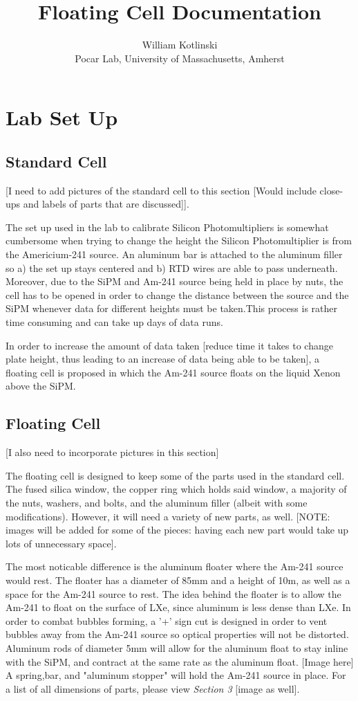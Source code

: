 \documentclass{article}%
\title{Floating Cell Documentation}
\date{\day}
\author{William Kotlinski\\Pocar Lab, University of Massachusetts, Amherst}
\begin{document}
\newpage
\tableofcontents
\newpage
\section{Lab Set Up}
\subsection{Standard Cell}
[I need to add pictures of the standard cell to this section [Would include close-ups and labels of parts that are discussed]].

The set up used in the lab to calibrate Silicon Photomultipliers is somewhat cumbersome when trying to change the height the Silicon Photomultiplier is from the Americium-241 source. An aluminum bar is attached to the aluminum filler so a) the set up stays centered and b) RTD wires are able to pass underneath. Moreover, due to the SiPM and Am-241 source being held in place by nuts, the cell has to be opened in order to change the distance between the source and the SiPM whenever data for different heights must be taken.This process is rather time consuming and can take up days of data runs. 

In order to increase the amount of data taken [reduce time it takes to change plate height, thus leading to an increase of data being able to be taken], a floating cell is proposed in which the Am-241 source floats on the liquid Xenon above the SiPM.
\subsection{Floating Cell}
[I also need to incorporate pictures in this section]

The floating cell is designed to keep some of the parts used in the standard cell. The fused silica window, the copper ring which holds said window,  a majority of the nuts, washers, and bolts, and the aluminum filler (albeit with some modifications). However, it will need a variety of new parts, as well. [NOTE: images will be added for some of the pieces: having each new part would take up lots of unnecessary space]. 

The most noticable difference is the aluminum floater where the Am-241 source would rest. The floater has a diameter of 85mm and a height of 10m, as well as a space for the Am-241 source to rest. The idea behind the floater is to allow the Am-241 to float on the surface of LXe, since aluminum is less dense than LXe. In order to combat bubbles forming, a '+' sign cut is designed in order to vent bubbles away from the Am-241 source so optical properties will not be distorted. Aluminum rods of diameter 5mm will allow for the aluminum float to stay inline with the SiPM, and contract at the same rate as the aluminum float. [Image here] A spring,bar, and "aluminum stopper" will hold the Am-241 source in place. For a list of all dimensions of parts, please view \textit{Section 3} [image as well]. 
\end{document}
